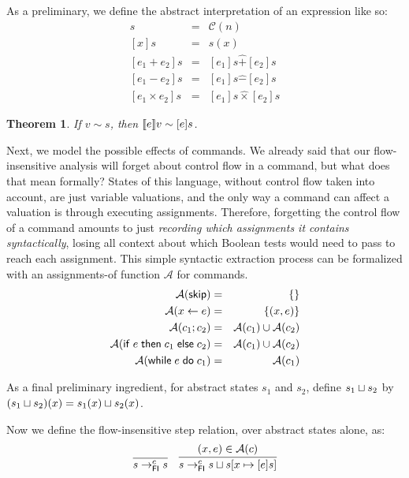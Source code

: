 \documentclass{amsbook}
\newtheorem{theorem}{Theorem}[chapter]
\theoremstyle{definition}
\theoremstyle{remark}
\numberwithin{section}{chapter}
\numberwithin{equation}{chapter}
\begin{document}
\newcommand{\absexp}[1]{[#1]}

As a preliminary, we define the abstract interpretation of an expression like so:
\begin{eqnarray*}
  \absexp{n}s &=& \mathcal C(n) \\
  \absexp{x}s &=& s(x) \\
  \absexp{e_1 + e_2}s &=& \absexp{e_1}s \hat{+} \absexp{e_2}s \\
  \absexp{e_1 - e_2}s &=& \absexp{e_1}s \hat{-} \absexp{e_2}s \\
  \absexp{e_1 \times e_2}s &=& \absexp{e_1}s \hat{\times} \absexp{e_2}s
\end{eqnarray*}

\begin{theorem}
  If $v \sim s$, then $\denote{e}v \sim \absexp{e}s$.
\end{theorem}

\newcommand{\asgns}[1]{\mathcal A(#1)}

Next, we model the possible effects of commands.
We already said that our flow-insensitive analysis will forget about control flow in a command, but what does that mean formally?
States of this language, without control flow taken into account, are just variable valuations, and the only way a command can affect a valuation is through executing assignments.
Therefore, forgetting the control flow of a command amounts to just \emph{recording which assignments it contains syntactically}, losing all context about which Boolean tests would need to pass to reach each assignment.
This simple syntactic extraction process can be formalized with an assignments-of function $\mathcal A$ for commands.
\begin{eqnarray*}
  \asgns{\skipe} &=& \{\} \\
  \asgns{\assign{x}{e}} &=& \{(x, e)\} \\
  \asgns{c_1; c_2} &=& \asgns{c_1} \cup \asgns{c_2} \\
  \asgns{\ifte{e}{c_1}{c_2}} &=& \asgns{c_1} \cup \asgns{c_2} \\
  \asgns{\while{e}{c_1}} &=& \asgns{c_1}
\end{eqnarray*}

As a final preliminary ingredient, for abstract states $s_1$ and $s_2$, define $s_1 \sqcup s_2$ by $(s_1 \sqcup s_2)(x) = s_1(x) \sqcup s_2(x)$.

Now we define the flow-insensitive step relation, over abstract states alone, as:
$$\infer{s \to^c_\mathsf{FI} s}{}
\quad \infer{s \to^c_\mathsf{FI} s \join \mupd{s}{x}{\absexp{e}s}}{
  (x, e) \in \asgns{c}
}$$
\end{document}
